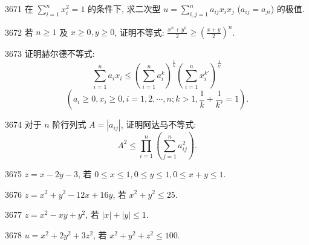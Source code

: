 \begin{prob}[M]{3671}
在 $\sum_{i=1}^{n} x_i^2 = 1$ 的条件下, 求二次型 $u = \sum_{i,j=1}^{n} a_{ij} x_i x_j$ ($a_{ij} = a_{ji}$) 的极值.
\end{prob}

\begin{prob}[M]{3672}
若 $n \geqslant 1$ 及 $x \geqslant 0, y \geqslant 0$, 证明不等式: $\frac{x^n + y^n}{2} \geqslant \left(\frac{x+y}{2}\right)^n$.
\end{prob}

\begin{prob}[M]{3673}
证明赫尔德不等式:
\[
\sum_{i=1}^{n} a_i x_i \leqslant \left(\sum_{i=1}^{n} a_i^k\right)^{\frac{1}{k}} \left(\sum_{i=1}^{n} x_i^{k'}\right)^{\frac{1}{k'}}
\]
\[
\left(a_i \geqslant 0, x_i \geqslant 0, i = 1, 2, \cdots, n; k > 1, \frac{1}{k} + \frac{1}{k'} = 1\right).
\]
\end{prob}

\begin{prob}[M]{3674}
对于 $n$ 阶行列式 $A = |a_{ij}|$, 证明阿达马不等式:
\[
A^2 \leqslant \prod_{i=1}^{n} \left(\sum_{j=1}^{n} a_{ij}^2\right).
\]
\end{prob}


\begin{prob}[S]{3675}
$z = x - 2y - 3$, 若 $0 \leqslant x \leqslant 1, 0 \leqslant y \leqslant 1, 0 \leqslant x + y \leqslant 1$.
\end{prob}

\begin{prob}[S]{3676}
$z = x^2 + y^2 - 12x + 16y$, 若 $x^2 + y^2 \leqslant 25$.
\end{prob}

\begin{prob}[S]{3677}
$z = x^2 - xy + y^2$, 若 $|x| + |y| \leqslant 1$.
\end{prob}

\begin{prob}[S]{3678}
$u = x^2 + 2y^2 + 3z^2$, 若 $x^2 + y^2 + z^2 \leqslant 100$.
\end{prob}

